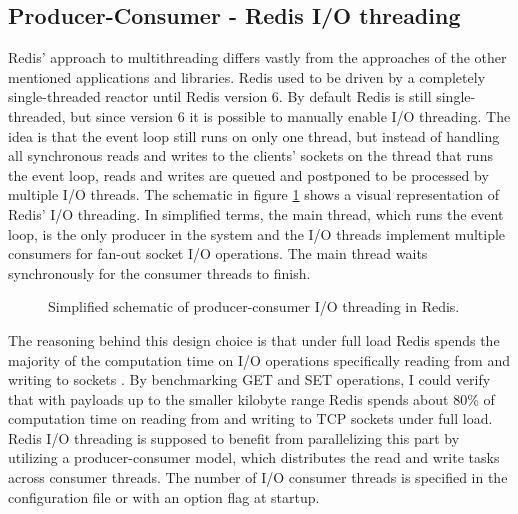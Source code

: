 \subsection{Producer-Consumer - Redis I/O threading}
Redis' approach to multithreading differs vastly from the approaches of the other mentioned applications and libraries. Redis used to be driven by a completely single-threaded reactor until Redis version 6. By default Redis is still single-threaded, but since version 6 it is possible to manually enable I/O threading. The idea is that the event loop still runs on only one thread, but instead of handling all synchronous reads and writes to the clients’ sockets on the thread that runs the event loop, reads and writes are queued and postponed to be processed by multiple I/O threads. The schematic in figure \ref{fig:redisio_arch} shows a visual representation of Redis’ I/O threading.\newline
In simplified terms, the main thread, which runs the event loop, is the only producer in the system and the I/O threads implement multiple consumers for fan-out socket I/O operations. The main thread waits synchronously for the consumer threads to finish.
\begin{figure}
  \centering
  \caption{Simplified schematic of producer-consumer I/O threading in Redis.}
  \label{fig:redisio_arch}
\end{figure}
The reasoning behind this design choice is that under full load Redis spends the majority of the computation time on I/O operations specifically reading from and writing to sockets \cite{antirez:io_threading}. By benchmarking GET and SET operations, I could verify that with payloads up to the smaller kilobyte range Redis spends about 80\% of computation time on reading from and writing to TCP sockets under full load. Redis I/O threading is supposed to benefit from parallelizing this part by utilizing a producer-consumer model, which distributes the read and write tasks across consumer threads. The number of I/O consumer threads is specified in the configuration file or with an option flag at startup. \newline
